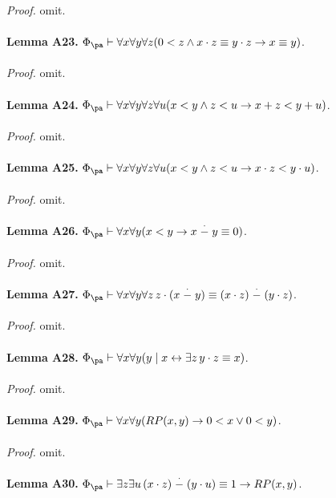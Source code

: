 \ \\
\textit{Proof.} omit.\\
\ \\
\textbf{Lemma A23.} $\Phi_\pa \vdash \forall x \forall y \forall z (0 < z \land x \cdot z \equiv y \cdot z \rightarrow x \equiv y)$.\\
\ \\
\textit{Proof.} omit.\\
\ \\
\textbf{Lemma A24.} $\Phi_\pa \vdash \forall x \forall y \forall z \forall u (x < y \land z < u \rightarrow x + z < y + u)$.\\
\ \\
\textit{Proof.} omit.\\
\ \\
\textbf{Lemma A25.} $\Phi_\pa \vdash \forall x \forall y \forall z \forall u (x < y \land z < u \rightarrow x \cdot z < y \cdot u)$.\\
\ \\
\textit{Proof.} omit.\\
\ \\
\textbf{Lemma A26.} $\Phi_\pa \vdash \forall x \forall y (x < y \rightarrow x \stackrel{.}{-} y \equiv 0)$.\\
\ \\
\textit{Proof.} omit.\\
\ \\
\textbf{Lemma A27.} $\Phi_\pa \vdash \forall x \forall y \forall z \, z \cdot (x \stackrel{.}{-} y) \equiv (x \cdot z) \stackrel{.}{-} (y \cdot z)$.\\
\ \\
\textit{Proof.} omit.\\
\ \\
\textbf{Lemma A28.} $\Phi_\pa \vdash \forall x \forall y (y \mid x \leftrightarrow \exists z \, y \cdot z \equiv x)$.\\
\ \\
\textit{Proof.} omit.\\
\ \\
\textbf{Lemma A29.} $\Phi_\pa \vdash \forall x \forall y (RP(x, y) \rightarrow 0 < x \lor 0 < y)$.\\
\ \\
\textit{Proof.} omit.\\
\ \\
\textbf{Lemma A30.} $\Phi_\pa \vdash \exists z \exists u \, (x \cdot z) \stackrel{.}{-} (y \cdot u) \equiv 1 \rightarrow RP(x, y)$.\\
\ \\
